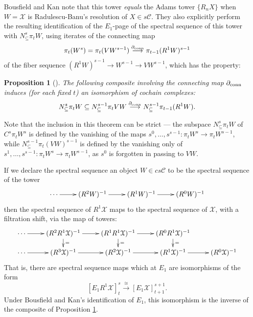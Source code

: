 \documentclass[11pt]{amsart} \renewcommand{\baselinestretch}{1.2}
\theoremstyle{plain}
\newtheorem{prop}[thm]{Proposition}
\numberwithin{equation}{section} %
\theoremstyle{plain}
\newtheorem{prop}[thm]{Proposition}
\numberwithin{equation}{chapter} %
\renewcommand{\to}{\longrightarrow}
\newcommand{\calT}{\mathcal{T}}
\newcommand{\calK}{\mathcal{K}}
\newcommand{\calx}{\mathcal{X}}
\newcommand{\calc}{\mathcal{C}}
\newcommand{\citeBOX}[2][]{\cite[\mbox{#1}]{#2}}
\newcommand{\algcat}{{\calc}}%
\newcommand{\Edownup}[5]{[E_{#1}^{#2}#3]^{#4}_{#5}}
\newcommand{\Dendo}{R}
\begin{document}
\begin{Operations on the Bousfield-Kan spectral sequence}
Bousfield and Kan  \citeBOX[\S3.3 and \S4.2]{BK_pairings_products.pdf} note that this tower \emph{equals} the Adams tower $\{R_nX\}$ when $W=\calx$ is Radulescu-Banu's resolution of $X\in s\algcat$. They also explicitly perform the resulting identification of the $E_1$-page of the spectral sequence of this tower with $N^s_\subseteq\pi_tW$, using iterates of the connecting map
\[\pi_t(W^{s})=\pi_t(VW^{s-1})\overset{\partial_\textup{conn} }{\to}\pi_{t-1}(\Dendo^1W)^{s-1}\]
of the fiber sequence $(\Dendo^1W)^{s-1}\to W^{s-1}\to VW^{s-1}$, which has the property:
\begin{prop}[{\cite[Proposition 5.2]{BK_pairings_products.pdf}}]
\label{BK D1 is awesome}
The following composite involving the connecting map $\partial_\textup{conn}$ induces (for each fixed $t$) an isomorphism of cochain complexes:
\[N^s_\subseteq \pi_t W\subseteq N^{s-1}_\subseteq \pi_t VW \overset{\partial_\textup{conn}}{\to}N^{s-1}_\subseteq \pi_{t-1} (\Dendo^1W).\]
\end{prop}
\noindent Note that the inclusion in this theorem can be strict --- the subspace $N^s_\subseteq \pi_t W$ of $C^s\pi_t W^s$ is defined by the vanishing of the maps $s^0,\ldots,s^{s-1}:\pi_t W^s\to \pi_t W^{s-1}$, while $ N^{s-1}_\subseteq \pi_t (VW)^{s-1}$ is defined by the vanishing only of $s^1,\ldots,s^{s-1}:\pi_t W^s\to \pi_t W^{s-1}$, as $s^0$ is forgotten in passing to $VW$.

If we declare the spectral sequence an object $W\in cs\algcat$ to be the spectral sequence of the tower
\[\xymatrix@R=4mm{
\cdots 
\ar[r]
&%
(\Dendo^2W)^{-1}
\ar[r]
&%
(\Dendo^1W)^{-1}
\ar[r]&%
(\Dendo^0W)^{-1}
}\]
then the spectral sequence of $\Dendo^1\calx$ maps to the spectral sequence of $\calx$, with a filtration shift, via the map of towers:
\[\xymatrix@R=4mm{
\cdots 
\ar[r]
&%
(\Dendo^2\Dendo^1\calx)^{-1}
\ar[r]\ar[d]^{=}
&%
(\Dendo^1\Dendo^1\calx)^{-1}
\ar[r]\ar[d]^{=}
&%
(\Dendo^0\Dendo^1\calx)^{-1}
\ar[d]^{=}
\\
\cdots 
\ar[r]
&%
(\Dendo^3\calx)^{-1}
\ar[r]
&%
(\Dendo^2\calx)^{-1}
\ar[r]
&%
(\Dendo^1\calx)^{-1}
\ar[r]&%
(\Dendo^0\calx)^{-1}
}\]
That is, there are spectral sequence maps which at $E_1$ are isomorphisms  of the form
\[\Edownup{1}{}{\Dendo^1\calx}{s}{t}\overset{\cong}{\to} \Edownup{1}{}{\calx}{s+1}{t+1}.\]
Under Bousfield and Kan's identification of $E_1$, this isomorphism is the inverse of the composite of Proposition \ref{BK D1 is awesome}.


\end{Operations on the Bousfield-Kan spectral sequence}
\end{document}
